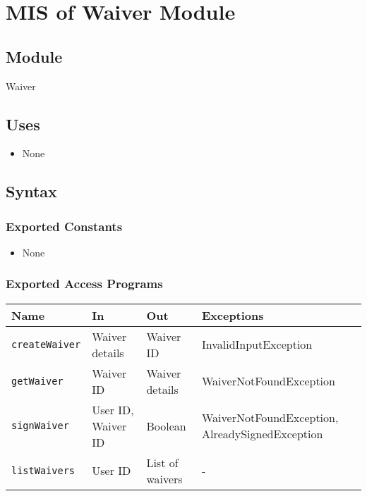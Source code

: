 \documentclass[12pt, titlepage]{article}
\begin{document}
\section{MIS of Waiver Module} \label{WaiverModule}

\subsection{Module}
Waiver

\subsection{Uses}

\begin{itemize}
    \item None
\end{itemize}

\subsection{Syntax}

\subsubsection{Exported Constants}
\begin{itemize}
    \item None
\end{itemize}

\subsubsection{Exported Access Programs}
\begin{center}
  \begin{tabular}{|p{3cm}|p{4cm}|p{4cm}|p{4cm}|}
    \hline
    \textbf{Name} & \textbf{In} & \textbf{Out} & \textbf{Exceptions} \\
    \hline
    \texttt{createWaiver} & Waiver details & Waiver ID & InvalidInputException \\
    \texttt{getWaiver} & Waiver ID & Waiver details & WaiverNotFoundException \\
    \texttt{signWaiver} & User ID, Waiver ID & Boolean & WaiverNotFoundException, AlreadySignedException \\
    \texttt{listWaivers} & User ID & List of waivers & - \\
  \end{tabular}
\end{center}
\end{document}

